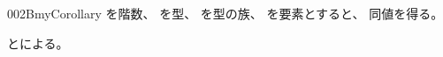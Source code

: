 \documentclass[index]{subfiles}
\begin{document}
\begin{myBlock}{002B}{myCorollary}
  を階数、
  を型、
  を型の族、
  を要素とすると、
  同値を得る。
\end{myBlock}
\begin{myProof}
  とによる。
\end{myProof}
\end{document}
